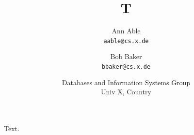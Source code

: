 \documentclass{article}
\begin{document}
\title{T}
\author{Ann Able\\ \texttt{aable@cs.x.de} \and Bob Baker\\ \texttt{bbaker@cs.x.de} \and Databases and Information Systems Group\\ Univ X, Country}
\maketitle
Text.
\end{document}
